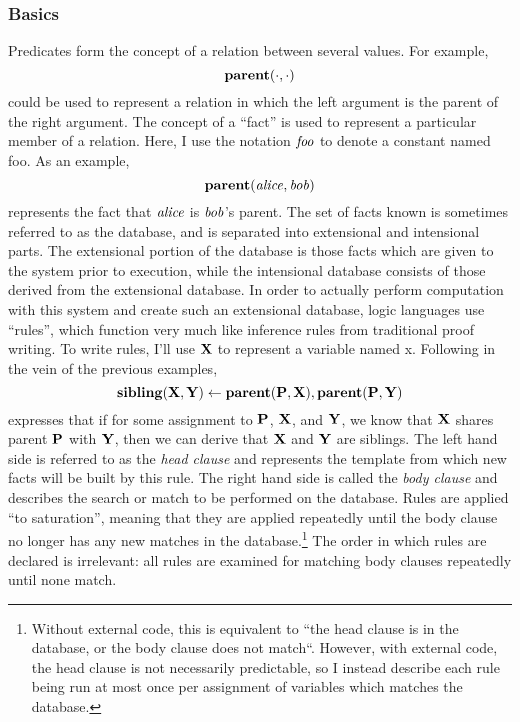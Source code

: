 \subsubsection{Basics}
Predicates form the concept of a relation between several values.
For example,
\[
        {\bf parent}(\cdot, \cdot)
\]
could be used to represent a relation in which the left argument is the parent of the right argument.
The concept of a ``fact'' is used to represent a particular member of a relation.
Here, I use the notation ${\it foo}$ to denote a constant named foo.
As an example,
\[
        {\bf parent}({\it alice}, {\it bob})
\]
represents the fact that ${\it alice}$ is ${\it bob}$'s parent.
The set of facts known is sometimes referred to as the database, and is separated into extensional and intensional parts.
The extensional portion of the database is those facts which are given to the system prior to execution, while the intensional database consists of those derived from the extensional database.
In order to actually perform computation with this system and create such an extensional database, logic languages use ``rules'', which function very much like inference rules from traditional proof writing.
To write rules, I'll use ${\bf X}$ to represent a variable named x.
Following in the vein of the previous examples,
\[
        {\bf sibling}({\bf X}, {\bf Y}) \leftarrow {\bf parent}({\bf P}, {\bf X}), {\bf parent}({\bf P}, {\bf Y})
\]
expresses that if for some assignment to ${\bf P}$, ${\bf X}$, and ${\bf Y}$, we know that ${\bf X}$ shares parent ${\bf P}$ with ${\bf Y}$, then we can derive that ${\bf X}$ and ${\bf Y}$ are siblings.
The left hand side is referred to as the \emph{head clause} and represents the template from which new facts will be built by this rule.
The right hand side is called the \emph{body clause} and describes the search or match to be performed on the database.
Rules are applied ``to saturation'', meaning that they are applied repeatedly until the body clause no longer has any new matches in the database.\footnote {
Without external code, this is equivalent to ``the head clause is in the database, or the body clause does not match``. However, with external code, the head clause is not necessarily predictable, so I instead describe each rule being run at most once per assignment of variables which matches the database.
}
The order in which rules are declared is irrelevant: all rules are examined for matching body clauses repeatedly until none match.
